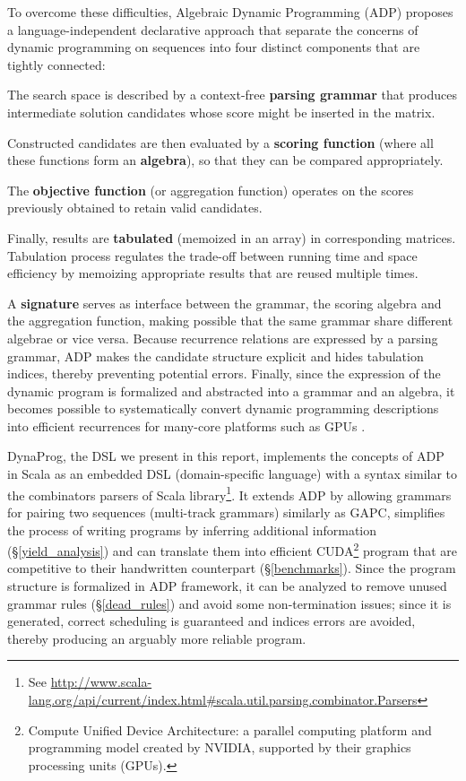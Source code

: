 To overcome these difficulties, Algebraic Dynamic Programming (ADP) \cite{adp} proposes a language-independent declarative approach that separate the concerns of dynamic programming on sequences into four distinct components that are tightly connected:\ol
\item The search space is described by a context-free \textbf{parsing grammar} that produces intermediate solution candidates whose score might be inserted in the matrix.
\item Constructed candidates are then evaluated by a \textbf{scoring function} (where all these functions form an \textbf{algebra}), so that they can be compared appropriately.
\item The \textbf{objective function} (or aggregation function) operates on the scores previously obtained to retain valid candidates.
\item Finally, results are \textbf{tabulated} (memoized in an array) in corresponding matrices. Tabulation process regulates the trade-off between running time and space efficiency by memoizing appropriate results that are reused multiple times.
\ole

A \textbf{signature} serves as interface between the grammar, the scoring algebra and the aggregation function, making possible that the same grammar share different algebrae or vice versa. Because recurrence relations are expressed by a parsing grammar, ADP makes the candidate structure explicit and hides tabulation indices, thereby preventing potential errors. Finally, since the expression of the dynamic program is formalized and abstracted into a grammar and an algebra, it becomes possible to systematically convert dynamic programming descriptions into efficient recurrences for many-core platforms such as GPUs \cite{adp_gpu}.

DynaProg, the DSL we present in this report, implements the concepts of ADP in Scala as an embedded DSL (domain-specific language) with a syntax similar to the combinators parsers of Scala library\footnote{See \url{http://www.scala-lang.org/api/current/index.html\#scala.util.parsing.combinator.Parsers}}. It extends ADP by allowing grammars for pairing two sequences (multi-track grammars) similarly as GAPC\cite{gapc_thesis}, simplifies the process of writing programs by inferring additional information (\S\ref{yield_analysis}) and can translate them into efficient CUDA\footnote{Compute Unified Device Architecture: a parallel computing platform and programming model created by NVIDIA, supported by their graphics processing units (GPUs).} program that are competitive to their handwritten counterpart (\S\ref{benchmarks}). Since the program structure is formalized in ADP framework, it can be analyzed to remove unused grammar rules (\S\ref{dead_rules}) and avoid some non-termination issues; since it is generated, correct scheduling is guaranteed and indices errors are avoided, thereby producing an arguably more reliable program.

